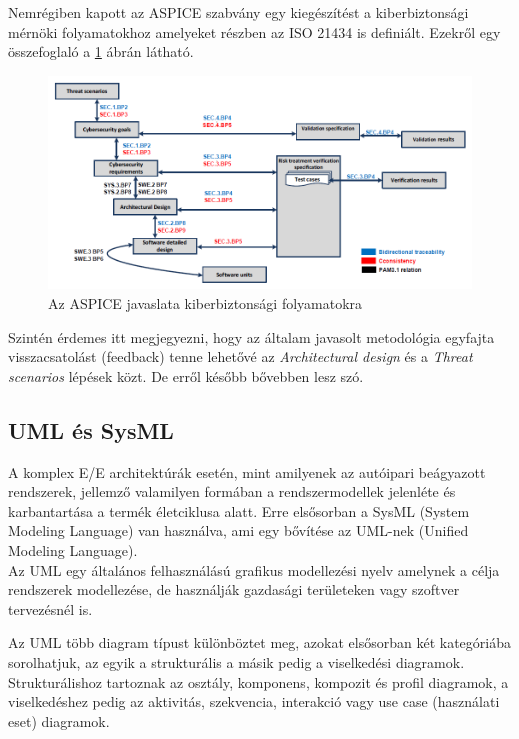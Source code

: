 Nemrégiben kapott az ASPICE\cite{ASPICE} szabvány egy kiegészítést a kiberbiztonsági mérnöki folyamatokhoz amelyeket részben az ISO 21434 is definiált. Ezekről egy összefoglaló a \ref{fig:ASPICE} ábrán látható.

\begin{figure}[!ht]
\centering
\includegraphics[width=150mm, keepaspectratio]{figures/02_ASPICE.png}
\caption{Az ASPICE javaslata kiberbiztonsági folyamatokra\cite{ASPICE}}
\label{fig:ASPICE}
\end{figure}

Szintén érdemes itt megjegyezni, hogy az általam javasolt metodológia egyfajta visszacsatolást (feedback) tenne lehetővé az \textit{Architectural design} és a \textit{Threat scenarios} lépések közt. De erről később bővebben lesz szó.

\subsection{UML és SysML}

A komplex E/E architektúrák esetén, mint amilyenek az autóipari beágyazott rendszerek, jellemző valamilyen formában a rendszermodellek jelenléte és karbantartása a termék életciklusa alatt. Erre elsősorban a SysML (System Modeling Language) van használva, ami egy bővítése az UML-nek (Unified Modeling Language).\\

Az UML egy általános felhasználású grafikus modellezési nyelv amelynek a célja rendszerek modellezése, de használják gazdasági területeken vagy szoftver tervezésnél is.

Az UML több diagram típust különböztet meg, azokat elsősorban két kategóriába sorolhatjuk, az egyik a strukturális a másik pedig a viselkedési diagramok. Strukturálishoz tartoznak az osztály, komponens, kompozit és profil diagramok, a viselkedéshez pedig az aktivitás, szekvencia, interakció vagy use case (használati eset) diagramok.

